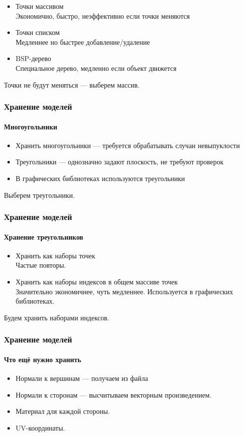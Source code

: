 \documentclass{beamer}
\begin{document}
\begin{frame}
\begin{frame}
\begin{itemize}
\item Точки массивом \\
Экономично, быстро, неэффективно если точки меняются
\item Точки списком \\
Медленнее но быстрее добавление/удаление
\item BSP-дерево \\
Специальное дерево, медленно если объект движется
\end{itemize}
Точки не будут меняться --- выберем массив.
\end{frame}

\begin{frame}
\frametitle{Хранение моделей}
\framesubtitle{Многоугольники}

\begin{itemize}
\item Хранить многоугольники --- требуется обрабатывать случаи невыпуклости
\item Треугольники --- однозначно задают плоскость, не требуют проверок
\item В графических библиотеках используются треугольники
\end{itemize}
Выберем треугольники.
\end{frame}

\begin{frame}
\frametitle{Хранение моделей}
\framesubtitle{Хранение треугольников}

\begin{itemize}
\item Хранить как наборы точек \\
Частые повторы.
\item Хранить как наборы индексов в общем массиве точек \\
Значительно экономичнее, чуть медленнее. Используется в графических библиотеках.
\end{itemize}
Будем хранить наборами индексов.
\end{frame}

\begin{frame}
\frametitle{Хранение моделей}
\framesubtitle{Что ещё нужно хранить}

\begin{itemize}
\item Нормали к вершинам --- получаем из файла
\item Нормали к сторонам --- высчитываем векторным произведением.
\item Материал для каждой стороны.
\item UV-координаты.
\end{itemize}
\end{frame}


\end{frame}
\end{document}
